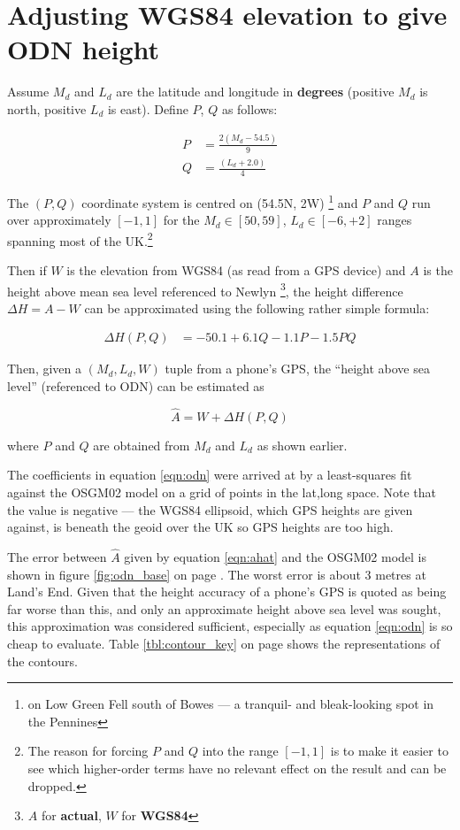 \documentclass[10pt,a4paper]{article}
\begin{document}
\section {Adjusting WGS84 elevation to give ODN height}
Assume $M_d$ and $L_d$ are the latitude and longitude in \textbf{degrees}
(positive $M_d$ is north, positive $L_d$ is east).  Define $P$, $Q$ as follows:

\begin{align}
P & = \frac{2\left(M_d - 54.5\right)}{9} \\
  Q & = \frac{\left(L_d + 2.0\right)}{4}
\end{align}

The $(P,Q)$ coordinate system is centred on (54.5\degree{}N, 2\degree{}W)
\footnote{on Low Green Fell south of Bowes --- a tranquil- and bleak-looking
spot in the Pennines}
and $P$ and $Q$ run over approximately $[-1,1]$ for the $M_d \in [50,59]$, $L_d
\in [-6,+2]$ ranges spanning most of the UK.\footnote{The reason for forcing
$P$ and $Q$ into the range $[-1,1]$ is to make it easier to see which
higher-order terms have no relevant effect on the result and can be dropped.}

Then if $W$ is the elevation from WGS84 (as read from a GPS device) and $A$ is
the height above mean sea level referenced to Newlyn
\footnote{$A$ for \textbf{actual}, $W$ for \textbf{WGS84}},
the height difference $\Delta H = A-W$ can be approximated using the following
rather simple formula:

\begin{align}
  \Delta H(P,Q) &= -50.1 + 6.1Q - 1.1P - 1.5 PQ
  \label{eqn:odn}
\end{align}

Then, given a $(M_d,L_d,W)$ tuple from a phone's GPS, the ``height above sea
level'' (referenced to ODN) can be estimated as

\begin{equation}
\hat{A} = W + \Delta H(P,Q)
\label{eqn:ahat}
\end{equation}

where $P$ and $Q$ are obtained from $M_d$ and $L_d$ as shown earlier.

The coefficients in equation \eqref{eqn:odn} were arrived at by a least-squares
fit against the OSGM02 model on a grid of points in the lat,long space.  Note
that the value is negative --- the WGS84 ellipsoid, which GPS heights are given
against, is beneath the geoid over the UK so GPS heights are too high.

The error between $\hat{A}$ given by equation \eqref{eqn:ahat} and the OSGM02
model is shown in figure \ref{fig:odn_base} on page \pageref{fig:odn_base}.  The worst
error is about 3 metres at Land's End.  Given that the height accuracy of a
phone's GPS is quoted as being far worse than this, and only an approximate
height above sea level was sought, this approximation was considered
sufficient, especially as equation \eqref{eqn:odn} is so cheap to evaluate.
Table \ref{tbl:contour_key} on page \pageref{tbl:contour_key} shows the
representations of the contours.
\end{document}

